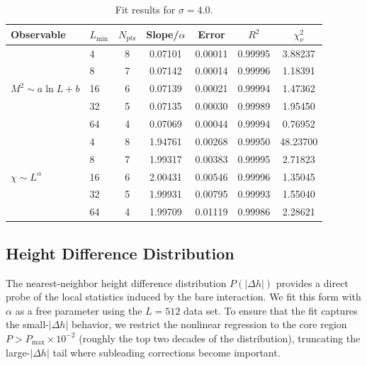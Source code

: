 \documentclass[11pt,a4paper]{article}
\begin{document}
\begin{table}[htbp]
\centering
\caption{Fit results for $\sigma=4.0$.}
\label{tab:fit40}
\small
\begin{tabular}{@{}llcS[table-format=1.5]S[table-format=1.5]S[table-format=1.5]S[table-format=2.5]@{}}
\toprule
Observable & $L_{\min}$ & $N_{\mathrm{pts}}$ & {Slope/$\alpha$} & {Error} & {$R^2$} & {$\chi^2_\nu$} \\
\midrule
{}
 & 4  & 8 & 0.07101 & 0.00011 & 0.99995 &  3.88237 \\
 & 8  & 7 & 0.07142 & 0.00014 & 0.99996 &  1.18391 \\
 & 16 & 6 & 0.07139 & 0.00021 & 0.99994 &  1.47362 \\
 & 32 & 5 & 0.07135 & 0.00030 & 0.99989 &  1.95450 \\
 & 64 & 4 & 0.07069 & 0.00044 & 0.99994 &  0.76952 \\
\midrule
{}
 & 4  & 8 & 1.94761 & 0.00268 & 0.99950 & 48.23700 \\
 & 8  & 7 & 1.99317 & 0.00383 & 0.99995 &  2.71823 \\
 & 16 & 6 & 2.00431 & 0.00546 & 0.99996 &  1.35045 \\
 & 32 & 5 & 1.99931 & 0.00795 & 0.99993 &  1.55040 \\
 & 64 & 4 & 1.99709 & 0.01119 & 0.99986 &  2.28621 \\
\bottomrule
\end{tabular}
\end{table}

\FloatBarrier
\subsection{Height Difference Distribution}

The nearest-neighbor height difference distribution $P(|\Delta h|)$ provides
a direct probe of the local statistics induced by the bare interaction.
We fit this form with $\alpha$ as a free parameter using the $L=512$ data set.
To ensure that the fit captures the small-$|\Delta h|$ behavior, we restrict
the nonlinear regression to the core region $P > P_{\max}\times 10^{-2}$
(roughly the top two decades of the distribution), truncating the
large-$|\Delta h|$ tail where subleading corrections become important.
\end{document}
